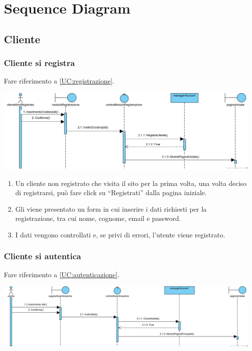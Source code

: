 \documentclass[12pt,a4paper]{article}
\begin{document}
\newpage

\section{Sequence Diagram}
\subsection{Cliente}
\subsubsection{Cliente si registra}
\label{SD:registrazione}

Fare riferimento a \ref{UC:registrazione}. \\

\begin{center}
\includegraphics[width=\textwidth]{SequenceDiagram/ClienteRegistrazione}
\end{center}

\begin{enumerate}
\item Un cliente non registrato che visita il sito per la prima volta, una volta deciso di registrarsi, può fare click su ``Registrati'' dalla pagina iniziale.
\item Gli viene presentato un form in cui inserire i dati richiesti per la registrazione, tra cui nome, cognome, email e password.
\item I dati vengono controllati e, se privi di errori, l'utente viene registrato.
\end{enumerate}

\subsubsection{Cliente si autentica}
\label{SD:login}

Fare riferimento a \ref{UC:autenticazione}. \\

\begin{center}
\includegraphics[width=\textwidth]{SequenceDiagram/Autenticazione}
\end{center}
\end{document}
